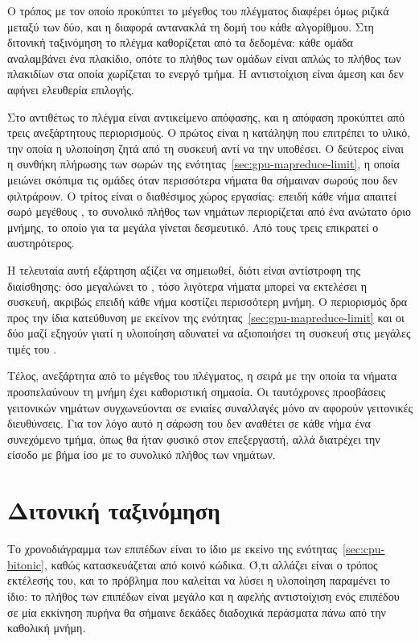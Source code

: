 Ο τρόπος με τον οποίο προκύπτει το μέγεθος του πλέγματος διαφέρει όμως ριζικά
μεταξύ των δύο, και η διαφορά αντανακλά τη δομή του κάθε αλγορίθμου. Στη
διτονική ταξινόμηση το πλέγμα καθορίζεται από τα δεδομένα: κάθε ομάδα αναλαμβάνει
ένα πλακίδιο, οπότε το πλήθος των ομάδων είναι απλώς το πλήθος των πλακιδίων στα
οποία χωρίζεται το ενεργό τμήμα. Η αντιστοίχιση είναι άμεση και δεν αφήνει
ελευθερία επιλογής.

Στο  αντιθέτως το πλέγμα είναι αντικείμενο απόφασης, και η
απόφαση προκύπτει από τρεις ανεξάρτητους περιορισμούς. Ο πρώτος είναι η
κατάληψη που επιτρέπει το υλικό, την οποία η υλοποίηση ζητά από τη συσκευή αντί
να την υποθέσει. Ο δεύτερος είναι η συνθήκη πλήρωσης των σωρών της
ενότητας~\ref{sec:gpu-mapreduce-limit}, η οποία μειώνει σκόπιμα τις ομάδες όταν
περισσότερα νήματα θα σήμαιναν σωρούς που δεν φιλτράρουν. Ο τρίτος είναι ο
διαθέσιμος χώρος εργασίας: επειδή κάθε νήμα απαιτεί σωρό μεγέθους , το
συνολικό πλήθος των νημάτων περιορίζεται από ένα ανώτατο όριο μνήμης, το οποίο
για τα μεγάλα  γίνεται δεσμευτικό. Από τους τρεις επικρατεί ο
αυστηρότερος.

Η τελευταία αυτή εξάρτηση αξίζει να σημειωθεί, διότι είναι αντίστροφη της
διαίσθησης: όσο μεγαλώνει το , τόσο λιγότερα νήματα μπορεί να εκτελέσει η
συσκευή, ακριβώς επειδή κάθε νήμα κοστίζει περισσότερη μνήμη. Ο περιορισμός
δρα προς την ίδια κατεύθυνση με εκείνον της
ενότητας~\ref{sec:gpu-mapreduce-limit} και οι δύο μαζί εξηγούν γιατί η
υλοποίηση αδυνατεί να αξιοποιήσει τη συσκευή στις μεγάλες τιμές του .

Τέλος, ανεξάρτητα από το μέγεθος του πλέγματος, η σειρά με την οποία τα νήματα
προσπελαύνουν τη μνήμη έχει καθοριστική σημασία. Οι ταυτόχρονες προσβάσεις
γειτονικών νημάτων συγχωνεύονται σε ενιαίες συναλλαγές μόνο αν αφορούν γειτονικές
διευθύνσεις. Για τον λόγο αυτό η σάρωση του  δεν αναθέτει σε κάθε
νήμα ένα συνεχόμενο τμήμα, όπως θα ήταν φυσικό στον επεξεργαστή, αλλά διατρέχει
την είσοδο με βήμα ίσο με το συνολικό πλήθος των νημάτων.

\section{Διτονική ταξινόμηση}
\label{sec:gpu-bitonic}

Το χρονοδιάγραμμα των επιπέδων είναι το ίδιο με εκείνο της
ενότητας~\ref{sec:cpu-bitonic}, καθώς κατασκευάζεται από κοινό κώδικα. Ό,τι
αλλάζει είναι ο τρόπος εκτέλεσής του, και το πρόβλημα που καλείται να λύσει η
υλοποίηση παραμένει το ίδιο: το πλήθος των επιπέδων είναι μεγάλο και η αφελής
αντιστοίχιση ενός επιπέδου σε μία εκκίνηση πυρήνα θα σήμαινε δεκάδες διαδοχικά
περάσματα πάνω από την καθολική μνήμη.

